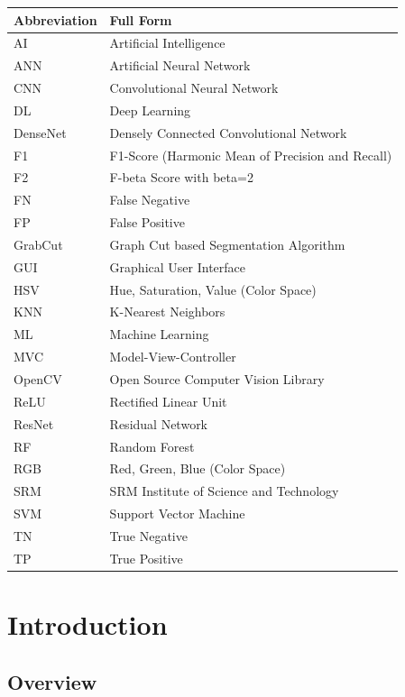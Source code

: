 \documentclass[12pt]{report}
\begin{document}
\begin{longtable}{p{4cm} p{10cm}}
\textbf{Abbreviation} & \textbf{Full Form} \\
\hline
AI & Artificial Intelligence \\
ANN & Artificial Neural Network \\
CNN & Convolutional Neural Network \\
DL & Deep Learning \\
DenseNet & Densely Connected Convolutional Network \\
F1 & F1-Score (Harmonic Mean of Precision and Recall) \\
F2 & F-beta Score with beta=2 \\
FN & False Negative \\
FP & False Positive \\
GrabCut & Graph Cut based Segmentation Algorithm \\
GUI & Graphical User Interface \\
HSV & Hue, Saturation, Value (Color Space) \\
KNN & K-Nearest Neighbors \\
ML & Machine Learning \\
MVC & Model-View-Controller \\
OpenCV & Open Source Computer Vision Library \\
ReLU & Rectified Linear Unit \\
ResNet & Residual Network \\
RF & Random Forest \\
RGB & Red, Green, Blue (Color Space) \\
SRM & SRM Institute of Science and Technology \\
SVM & Support Vector Machine \\
TN & True Negative \\
TP & True Positive \\
\end{longtable}

\chapter{Introduction}
\thispagestyle{fancy}

\section{Overview}
\end{document}
